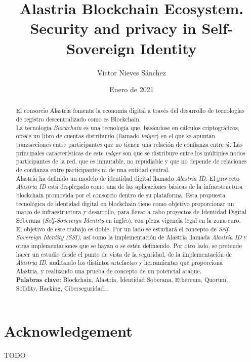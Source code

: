 \documentclass[a4paper, 12pt]{article} %
\author{Víctor Nieves Sánchez}
\date{Enero de 2021}
\title{Alastria Blockchain Ecosystem. Security and privacy in Self- Sovereign Identity}
\begin{document}
\maketitle
\null
\newpage

\section*{Acknowledgement}
    TODO
\newpage

\tableofcontents
\newpage

\listoffigures
\listoftables
\newpage

\begin{otherlanguage}{spanish}
    \renewcommand{\spanishabstractname}{Resumen}
    \begin{abstract}
        \normalsize
        El consorcio Alastria fomenta la economía digital a través del desarrollo de tecnologías de registro descentralizado como es Blockchain.\\
          
        La tecnología \textit{Blockchain} es una tecnología que, basándose en cálculos criptográficos, ofrece un libro de cuentas distribuido (llamado \textit{ledger}) en el que se apuntan transacciones entre participantes que no tienen una relación de confianza entre si. Las principales características de este \textit{ledger} son que se distribuye entre los múltiples nodos participantes de la red, que es inmutable, no repudiable y que no depende de relaciones de confianza entre participantes ni de una entidad central.\\
        
        Alastria ha definido un modelo de identidad digital llamado \textit{Alastria ID}. El proyecto \textit{Alastria ID} está desplegado como una de las aplicaciones básicas de la infraestructura blockchain promovida por el consorcio dentro de su plataforma. Esta propuesta tecnológica de identidad digital en blockchain tiene como objetivo proporcionar un marco de infraestructura y desarrollo, para llevar a cabo proyectos de Identidad Digital Soberana (\textit{Self-Sovereign Identity} en inglés), con plena vigencia legal en la zona euro.\\
        
        El objetivo de este trabajo es doble. Por un lado se estudiará el concepto de \textit{Self-Sovereign Identity (SSI)}, así como la implementación de Alastria llamada \textit{Alastria ID} y otras implementaciones que se hayan o se estén definiendo. Por otro lado, se pretende hacer un estudio desde el punto de vista de la seguridad, de la implementación de \textit{Alastria ID}, auditando los distintos artefactos y herramientas que proporciona Alastria, y realizando una prueba de concepto de un potencial ataque.\\
        
        \textbf{Palabras clave:} Blockchain, Alastria, Identidad Soberana, Ethereum, Quorum, Solidity, Hacking, Ciberseguridad\ldots
    \end{abstract}
\end{otherlanguage}
\end{document}

